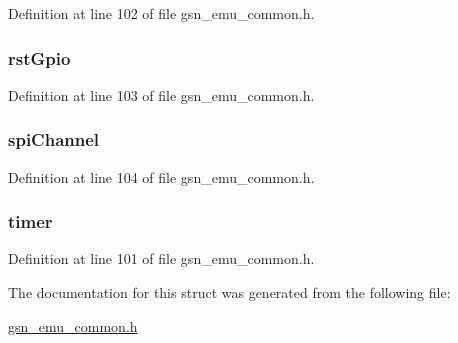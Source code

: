 Definition at line 102 of file gsn\_\-emu\_\-common.h.

\hypertarget{a00065_a09beb351c65ecd0d64c843a49a29e215}{
\subsubsection[{rstGpio}]{ {\bf rstGpio}}}
\label{a00065_a09beb351c65ecd0d64c843a49a29e215}


Definition at line 103 of file gsn\_\-emu\_\-common.h.

\hypertarget{a00065_a83a2309a5073ea257cf95ec84fa387e5}{
\subsubsection[{spiChannel}]{ {\bf spiChannel}}}
\label{a00065_a83a2309a5073ea257cf95ec84fa387e5}


Definition at line 104 of file gsn\_\-emu\_\-common.h.

\hypertarget{a00065_ae85406cd4c57a001e8a590bdb2163b65}{
\subsubsection[{timer}]{ {\bf timer}}}
\label{a00065_ae85406cd4c57a001e8a590bdb2163b65}


Definition at line 101 of file gsn\_\-emu\_\-common.h.



The documentation for this struct was generated from the following file:\begin{DoxyCompactItemize}
\item 
\hyperlink{a00490}{gsn\_\-emu\_\-common.h}\end{DoxyCompactItemize}
